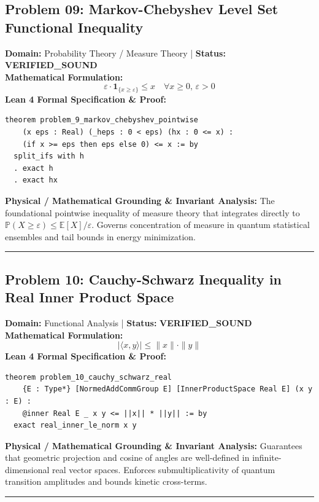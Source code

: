 \documentclass[10pt,a4paper]{article}
\begin{document}
\subsection*{Problem 09: Markov-Chebyshev Level Set Functional Inequality}
\textbf{Domain:} Probability Theory / Measure Theory \quad | \quad \textbf{Status:} \textcolor{green!70!black}{\textbf{VERIFIED\_SOUND}}\\
\textbf{Mathematical Formulation:}
\begin{equation*}
  \varepsilon \cdot \mathbf{1}_{\{x \ge \varepsilon\}} \le x \quad \forall x \ge 0, \, \varepsilon > 0
\end{equation*}
\textbf{Lean 4 Formal Specification \& Proof:}
\begin{lstlisting}
theorem problem_9_markov_chebyshev_pointwise
    (x eps : Real) (_heps : 0 < eps) (hx : 0 <= x) :
    (if x >= eps then eps else 0) <= x := by
  split_ifs with h
  . exact h
  . exact hx
\end{lstlisting}
\textbf{Physical / Mathematical Grounding \& Invariant Analysis:}
The foundational pointwise inequality of measure theory that integrates directly to $\mathbb{P}(X \ge \varepsilon) \le \mathbb{E}[X]/\varepsilon$. Governs concentration of measure in quantum statistical ensembles and tail bounds in energy minimization.
\vspace{0.8em}\hrule\vspace{0.8em}
\subsection*{Problem 10: Cauchy-Schwarz Inequality in Real Inner Product Space}
\textbf{Domain:} Functional Analysis \quad | \quad \textbf{Status:} \textcolor{green!70!black}{\textbf{VERIFIED\_SOUND}}\\
\textbf{Mathematical Formulation:}
\begin{equation*}
  |\langle x, y \rangle| \le \|x\| \cdot \|y\|
\end{equation*}
\textbf{Lean 4 Formal Specification \& Proof:}
\begin{lstlisting}
theorem problem_10_cauchy_schwarz_real
    {E : Type*} [NormedAddCommGroup E] [InnerProductSpace Real E] (x y : E) :
    @inner Real E _ x y <= ||x|| * ||y|| := by
  exact real_inner_le_norm x y
\end{lstlisting}
\textbf{Physical / Mathematical Grounding \& Invariant Analysis:}
Guarantees that geometric projection and cosine of angles are well-defined in infinite-dimensional real vector spaces. Enforces submultiplicativity of quantum transition amplitudes and bounds kinetic cross-terms.
\vspace{0.8em}\hrule\vspace{0.8em}
\end{document}
